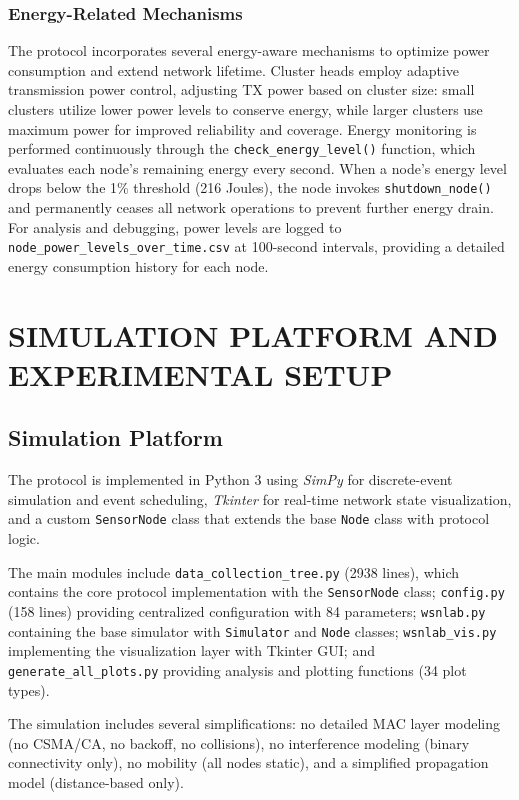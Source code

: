 \documentclass[conference]{IEEEtran}
\begin{document}
\subsubsection{Energy-Related Mechanisms}
The protocol incorporates several energy-aware mechanisms to optimize power consumption and extend network lifetime. Cluster heads employ adaptive transmission power control, adjusting TX power based on cluster size: small clusters utilize lower power levels to conserve energy, while larger clusters use maximum power for improved reliability and coverage. Energy monitoring is performed continuously through the \texttt{check\_energy\_level()} function, which evaluates each node's remaining energy every second. When a node's energy level drops below the 1\% threshold (216 Joules), the node invokes \texttt{shutdown\_node()} and permanently ceases all network operations to prevent further energy drain. For analysis and debugging, power levels are logged to \texttt{node\_power\_levels\_over\_time.csv} at 100-second intervals, providing a detailed energy consumption history for each node.

\section{SIMULATION PLATFORM AND EXPERIMENTAL SETUP}

\subsection{Simulation Platform}

The protocol is implemented in Python 3 using \emph{SimPy} for discrete-event simulation and event scheduling, \emph{Tkinter} for real-time network state visualization, and a custom \texttt{SensorNode} class that extends the base \texttt{Node} class with protocol logic.

The main modules include \texttt{data\_collection\_tree.py} (2938 lines), which contains the core protocol implementation with the \texttt{SensorNode} class; \texttt{config.py} (158 lines) providing centralized configuration with 84 parameters; \texttt{wsnlab.py} containing the base simulator with \texttt{Simulator} and \texttt{Node} classes; \texttt{wsnlab\_vis.py} implementing the visualization layer with Tkinter GUI; and \texttt{generate\_all\_plots.py} providing analysis and plotting functions (34 plot types).

The simulation includes several simplifications: no detailed MAC layer modeling (no CSMA/CA, no backoff, no collisions), no interference modeling (binary connectivity only), no mobility (all nodes static), and a simplified propagation model (distance-based only).
\end{document}

